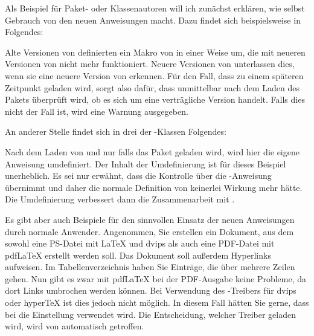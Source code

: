 \begin{Example}
  Als Beispiel für Paket- oder Klassenautoren will ich zunächst
  erklären, wie \KOMAScript{} selbst Gebrauch von den neuen
  Anweisungen macht. Dazu findet sich beispielsweise in 
  Folgendes:
\begin{lstcode}
\end{lstcode}
  Alte Versionen von  definierten ein Makro von
   in einer Weise um, die mit neueren Versionen
  von \KOMAScript{} nicht mehr funktioniert. Neuere Versionen von
   unterlassen dies, wenn sie eine neuere Version
  von \KOMAScript{} erkennen. Für den Fall, dass 
  zu einem späteren Zeitpunkt geladen wird, sorgt also 
  dafür, dass unmittelbar nach dem Laden des Pakets überprüft wird, ob
  es sich um eine verträgliche Version handelt. Falls dies nicht der
  Fall ist, wird eine Warnung ausgegeben.

  An anderer Stelle findet sich in drei der \KOMAScript-Klassen Folgendes:
\begin{lstcode}
  \AfterPackage{caption2}{%
    \renewcommand*{\setcapindent}{%
\end{lstcode}%
  Nach dem Laden von  und nur falls das Paket
  geladen wird, wird hier die \KOMAScript{} eigene Anweisung
   umdefiniert. Der Inhalt der Umdefinierung
  ist für dieses Beispiel unerheblich. Es sei nur erwähnt, dass
   die Kontrolle über die
  -Anweisung übernimmt und daher die normale
  Definition von  keinerlei Wirkung mehr
  hätte. Die Umdefinierung verbessert dann die Zusammenarbeit mit
  .

  Es gibt aber auch Beispiele für den sinnvollen Einsatz der neuen
  Anweisungen durch normale Anwender. Angenommen, Sie erstellen ein
  Dokument, aus dem sowohl eine PS-Datei mit \LaTeX{} und dvips als auch
  eine PDF-Datei mit \mbox{pdf\LaTeX} erstellt werden soll. Das Dokument soll
  außerdem Hyperlinks aufweisen. Im Tabellenverzeichnis haben Sie
  Einträge, die über mehrere Zeilen gehen. Nun gibt es zwar mit
  \mbox{pdf\LaTeX} bei der PDF-Ausgabe keine Probleme, da dort Links
  umbrochen werden können. Bei Verwendung des
  -Treibers für dvips oder
  \mbox{hyper\TeX} ist dies jedoch nicht
  möglich. In diesem Fall hätten Sie gerne, dass bei
   die Einstellung  verwendet
  wird. Die Entscheidung, welcher Treiber geladen wird, wird von
   automatisch getroffen.


\end{Example}
